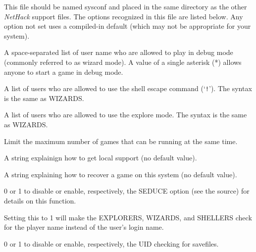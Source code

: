 This file should be named sysconf and placed in the same directory as
the other {\it NetHack\/} support files.
The options recognized in this file are listed below. Any option not
set uses a compiled-in default (which may not be appropriate for your
system).

\blist{}
\item[\ib{WIZARDS}]
A space-separated list of user name who are allowed to
play in debug mode (commonly referred to as wizard mode).
A value of a single
asterisk (*) allows anyone to start a game in debug mode.
\item[\ib{SHELLERS}]
A list of users who are allowed to use the shell escape command (`{\tt !}').
The syntax is the same as WIZARDS.
\item[\ib{EXPLORERS}]
A list of users who are allowed to use the explore mode.
The syntax is the same as WIZARDS.
\item[\ib{MAXPLAYERS}]
Limit the maximum number of games that can be running at the same time.
\item[\ib{SUPPORT}]
A string explainign how to get local support (no default value).
\item[\ib{RECOVER}]
A string explaining how to recover a game on this system (no default value).
\item[\ib{SEDUCE}]
0 or 1 to disable or enable, respectively, the SEDUCE option (see the source)
for details on this function.
\item[\ib{CHECK\verb+_+PLNAME}]
Setting this to 1 will make the EXPLORERS, WIZARDS, and SHELLERS check
for the player name instead of the user's login name.
\item[\ib{CHECK\verb+_+SAVE\verb+_+UID}]
0 or 1 to disable or enable, respectively, the UID checking for savefiles.
\elist

